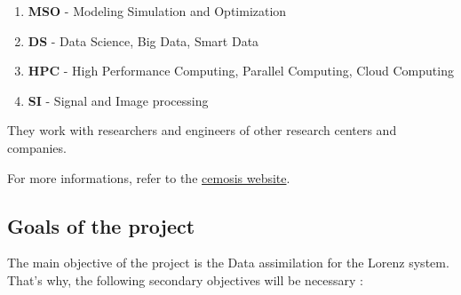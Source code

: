 \documentclass[12pt]{article}
\begin{document}
	\begin{enumerate}[label=\textbullet]
		\item \textbf{MSO} - Modeling Simulation and Optimization
		\item \textbf{DS} -	Data Science, Big Data, Smart Data
		\item \textbf{HPC} - High Performance Computing, Parallel Computing, Cloud Computing
		\item \textbf{SI} - Signal and Image processing
	\end{enumerate}
	\noindent They work with researchers and engineers of other research centers and companies.
	
	\noindent For more informations, refer to the \href{http://www.cemosis.fr/}{cemosis website}. 
	
	\newpage
	
	\subsection{Goals of the project}
	
	 The main objective of the project is the Data assimilation for the Lorenz system. That's why, the following secondary objectives will be necessary :
 
\end{document}
